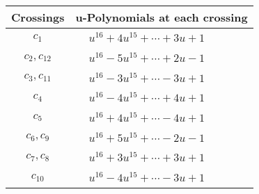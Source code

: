 \documentclass[1p]{elsarticle_modified}
\theoremstyle{definition}
\begin{document}
\begin{tabular}{m{50pt}|m{274pt}}
Crossings & \hspace{64pt}u-Polynomials at each crossing \\
\hline $$\begin{aligned}c_{1}\end{aligned}$$&$\begin{aligned}
&u^{16}+4 u^{15}+\cdots+3 u+1
\end{aligned}$\\
\hline $$\begin{aligned}c_{2},c_{12}\end{aligned}$$&$\begin{aligned}
&u^{16}-5 u^{15}+\cdots+2 u-1
\end{aligned}$\\
\hline $$\begin{aligned}c_{3},c_{11}\end{aligned}$$&$\begin{aligned}
&u^{16}-3 u^{15}+\cdots-3 u+1
\end{aligned}$\\
\hline $$\begin{aligned}c_{4}\end{aligned}$$&$\begin{aligned}
&u^{16}-4 u^{15}+\cdots+4 u+1
\end{aligned}$\\
\hline $$\begin{aligned}c_{5}\end{aligned}$$&$\begin{aligned}
&u^{16}+4 u^{15}+\cdots-4 u+1
\end{aligned}$\\
\hline $$\begin{aligned}c_{6},c_{9}\end{aligned}$$&$\begin{aligned}
&u^{16}+5 u^{15}+\cdots-2 u-1
\end{aligned}$\\
\hline $$\begin{aligned}c_{7},c_{8}\end{aligned}$$&$\begin{aligned}
&u^{16}+3 u^{15}+\cdots+3 u+1
\end{aligned}$\\
\hline $$\begin{aligned}c_{10}\end{aligned}$$&$\begin{aligned}
&u^{16}-4 u^{15}+\cdots-3 u+1
\end{aligned}$\\
\hline
\end{tabular}\\~\\
\end{document}
